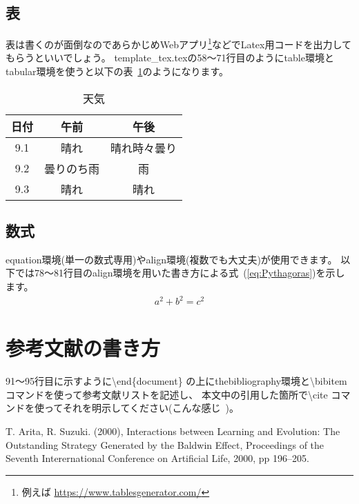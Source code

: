 \documentclass[9pt,a4paper]{jarticle}	%
\begin{document}
\subsection{表}
表は書くのが面倒なのであらかじめWebアプリ\footnote{例えば \url{https://www.tablesgenerator.com/}}などでLatex用コードを出力してもらうといいでしょう。
template\_tex.texの58〜71行目のようにtable環境とtabular環境を使うと以下の表~\ref{tab:tenki}のようになります。
%
\begin{table}[h]
	\centering
	\caption{天気}
	\begin{tabular}{|c|c|c|}
		\hline
		日付  & 午前       & 午後     \\
		\hline
		9.1   & 晴れ       & 晴れ時々曇り \\
		9.2   & 曇りのち雨 & 雨      \\
		9.3   & 晴れ       & 晴れ     \\
		\hline
	\end{tabular}
	\label{tab:tenki}
\end{table}


\subsection{数式}
equation環境(単一の数式専用)やalign環境(複数でも大丈夫)が使用できます。
以下では78〜81行目のalign環境を用いた書き方による式~(\ref{eq:Pythagoras})を示します。
%
\begin{align}
a^2 + b^2 = c^2
\label{eq:Pythagoras}
\end{align}



\section{参考文献の書き方}
91〜95行目に示すように\textbackslash end\{document\} の上にthebibliography環境と\textbackslash bibitem コマンドを使って参考文献リストを記述し、
本文中の引用した箇所で\textbackslash cite コマンドを使ってそれを明示してください(こんな感じ~\cite{AritaSuzuki2000ALIFE})。



\setcounter{section}{\thesection+1}	%
\begin{thebibliography}{99}		%
 T. Arita, R. Suzuki. (2000), Interactions between Learning and Evolution: The Outstanding Strategy Generated by the Baldwin Effect, Proceedings of the Seventh Interernational Conference on Artificial Life, 2000, pp 196--205. 
\end{thebibliography}
\end{document}
